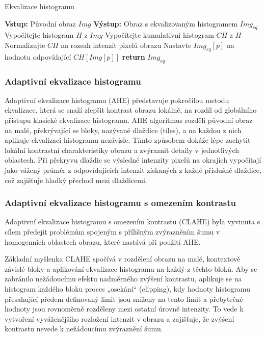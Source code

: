 \documentclass[male,czech,api_ing]{thesis}
\begin{document}
\begin{algorithm}
    \caption{Ekvalizace histogramu}
    \begin{algorithmic}[1]
        \State \textbf{Vstup:} Původní obraz $Img$
        \State \textbf{Výstup:} Obraz s ekvalizovaným histogramem $Img_{eq}$
        \State Vypočítejte histogram $H$ z $Img$
        \State Vypočítejte kumulativní histogram $CH$ z $H$
        \State Normalizujte $CH$ na rozsah intenzit pixelů obrazu
            \State Nastavte $Img_{eq}[p]$ na hodnotu odpovídající $CH[Img[p]]$
        \EndFor
        \State \textbf{return} $Img_{eq}$
    \end{algorithmic}
\end{algorithm}

\subsubsection{Adaptivní ekvalizace histogramu}
Adaptivní ekvalizace histogramu (AHE) představuje pokročilou metodu ekvalizace, která se snaží zlepšit kontrast obrazu lokálně, na rozdíl od globálního přístupu klasické ekvalizace histogramu. AHE algoritmus rozdělí původní obraz na malé, překrývající se bloky, nazývané dlaždice (tiles), a na každou z nich aplikuje ekvalizaci histogramu nezávisle. Tímto způsobem dokáže lépe zachytit lokální kontrastní charakteristiky obrazu a zvýraznit detaily v jednotlivých oblastech. Při překryvu dlaždic se výsledné intenzity pixelů na okrajích vypočítají jako vážený průměr z odpovídajících intenzit získaných z každé příslušné dlaždice, což zajišťuje hladký přechod mezi dlaždicemi. \cite{GraphicsGems}

\subsubsection{Adaptivní ekvalizace histogramu s omezením kontrastu}
Adaptivní ekvalizace histogramu s omezením kontrastu (CLAHE) byla vyvinuta s cílem předejít problémům spojeným s přílišným zvýrazněním šumu v homogenních oblastech obrazu, které nastává při použití AHE.

Základní myšlenka CLAHE spočívá v rozdělení obrazu na malé, kontextově závislé bloky a aplikování ekvalizace histogramu na každý z těchto bloků. Aby se zabránilo nežádoucímu efektu nadměrného zvýšení kontrastu, aplikuje se na histogram každého bloku proces „osekání“ (clipping), kdy hodnoty histogramu přesahující předem definovaný limit jsou sníženy na tento limit a přebytečné hodnoty jsou rovnoměrně rozděleny mezi ostatní úrovně intenzity. To vede k vytvoření vyváženějšího rozložení intenzit v obrazu a zajišťuje, že zvýšení kontrastu nevede k nežádoucímu zvýraznění šumu. 
\end{document}
